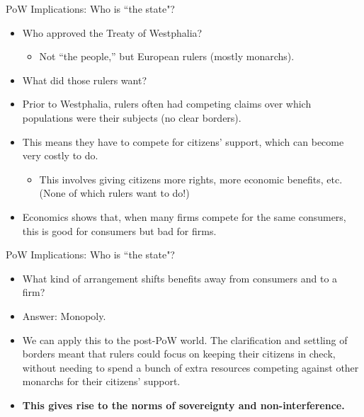 \documentclass{beamer}
\begin{document}
\begin{frame}{\LARGE PoW Implications: Who is ``the state"?}
	\begin{itemize}
		\item Who approved the Treaty of Westphalia? \pause
		\begin{itemize}
			\item Not ``the people,” but European rulers (mostly monarchs).
		\end{itemize}
		\item What did those rulers want? \pause
		\item Prior to Westphalia, rulers often had competing claims over which populations were their subjects (no clear borders). \pause
		\item This means they have to compete for citizens’ support, which can become very costly to do.
		\begin{itemize}
			\item This involves giving citizens more rights, more economic benefits, etc. (None of which rulers want to do!)
		\end{itemize}
		\item Economics shows that, when many firms compete for the same consumers, this is good for consumers but bad for firms.		
	\end{itemize}
\end{frame}

\begin{frame}{\LARGE PoW Implications: Who is ``the state"?}
\begin{itemize}
	\item What kind of arrangement shifts benefits away from consumers and to a firm? \pause
	\item Answer: Monopoly. \pause
	\item We can apply this to the post-PoW world. The clarification and settling of borders meant that rulers could focus on keeping their citizens in check, without needing to spend a bunch of extra resources competing against other monarchs for their citizens' support. 
	\item \textbf{This gives rise to the norms of sovereignty and non-interference.} 
\end{itemize}
\end{frame}
\end{document}
